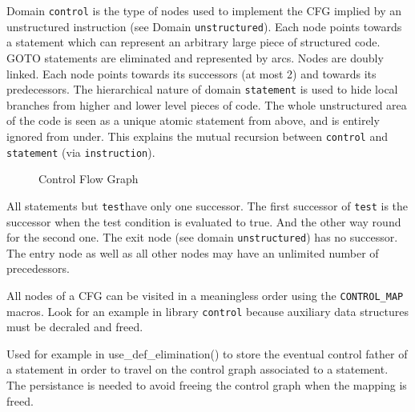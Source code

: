 { 

Domain \verb/control/ is the type of nodes used to implement the CFG
implied by an unstructured instruction (see Domain
\verb/unstructured/). Each node points towards a statement which can
represent an arbitrary large piece of structured code. GOTO statements
are eliminated and represented by arcs. Nodes are doubly linked. Each
node points towards its successors (at most 2) and towards its
predecessors. The hierarchical nature of
domain \verb/statement/ is used to hide local branches from higher and
lower level pieces of code. The whole unstructured area of the code is
seen as a unique atomic statement from above, and is entirely ignored
from under. This explains the mutual recursion between \verb/control/
and \verb/statement/ (via \verb/instruction/).

\begin{figure}
\begin{center}
\mbox{}
\end{center}
\caption{Control Flow Graph}
\label{figure-unstructured}
\end{figure}

All statements but \verb/test/have only one successor. The first
successor of \verb/test/ is the successor when the test condition is
evaluated to true.  And the other way round for the second one. The exit
node (see domain \verb/unstructured/) has no successor. The entry node
as well as all other nodes may have an unlimited number of precedessors.

All nodes of a CFG can be visited in a meaningless order using the
\verb/CONTROL_MAP/ macros. Look for an example in library \verb/control/
because auxiliary data structures must be decraled and freed.

}

{
  Used for example in use_def_elimination() to store the eventual control
  father of a statement in order to travel on the control graph
  associated to a statement. The persistance is needed to avoid
  freeing the control graph when the mapping is freed.
}

